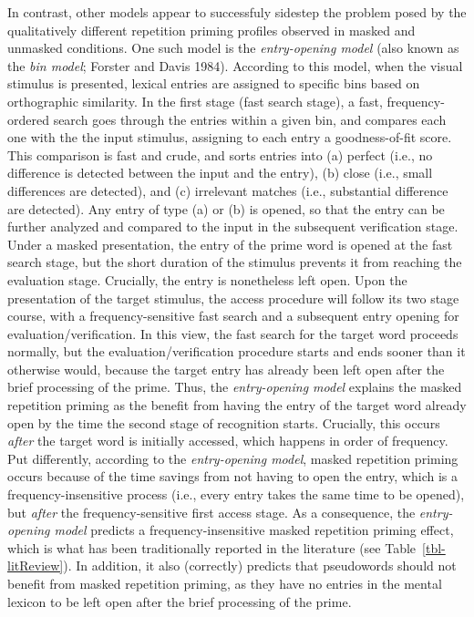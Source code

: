 \documentclass[
]{interact}
\begin{document}
In contrast, other models appear to successfuly sidestep the problem
posed by the qualitatively different repetition priming profiles
observed in masked and unmasked conditions. One such model is the
\emph{entry-opening model} (also known as the \emph{bin model}; Forster
and Davis 1984). According to this model, when the visual stimulus is
presented, lexical entries are assigned to specific bins based on
orthographic similarity. In the first stage (fast search stage), a fast,
frequency-ordered search goes through the entries within a given bin,
and compares each one with the the input stimulus, assigning to each
entry a goodness-of-fit score. This comparison is fast and crude, and
sorts entries into (a) perfect (i.e., no difference is detected between
the input and the entry), (b) close (i.e., small differences are
detected), and (c) irrelevant matches (i.e., substantial difference are
detected). Any entry of type (a) or (b) is opened, so that the entry can
be further analyzed and compared to the input in the subsequent
verification stage. Under a masked presentation, the entry of the prime
word is opened at the fast search stage, but the short duration of the
stimulus prevents it from reaching the evaluation stage. Crucially, the
entry is nonetheless left open. Upon the presentation of the target
stimulus, the access procedure will follow its two stage course, with a
frequency-sensitive fast search and a subsequent entry opening for
evaluation/verification. In this view, the fast search for the target
word proceeds normally, but the evaluation/verification procedure starts
and ends sooner than it otherwise would, because the target entry has
already been left open after the brief processing of the prime. Thus,
the \emph{entry-opening model} explains the masked repetition priming as
the benefit from having the entry of the target word already open by the
time the second stage of recognition starts. Crucially, this occurs
\emph{after} the target word is initially accessed, which happens in
order of frequency. Put differently, according to the
\emph{entry-opening model}, masked repetition priming occurs because of
the time savings from not having to open the entry, which is a
frequency-insensitive process (i.e., every entry takes the same time to
be opened), but \emph{after} the frequency-sensitive first access stage.
As a consequence, the \emph{entry-opening model} predicts a
frequency-insensitive masked repetition priming effect, which is what
has been traditionally reported in the literature (see
Table~\ref{tbl-litReview}). In addition, it also (correctly) predicts
that pseudowords should not benefit from masked repetition priming, as
they have no entries in the mental lexicon to be left open after the
brief processing of the prime.
\end{document}
